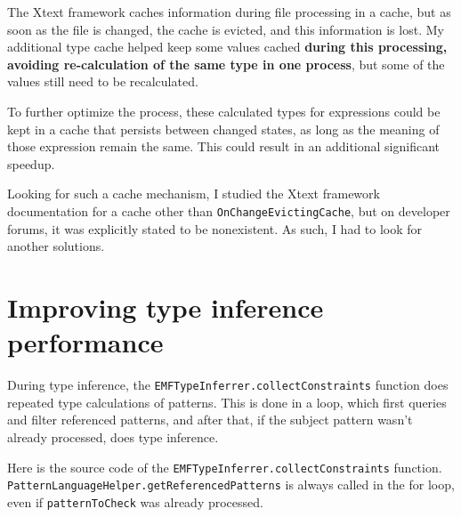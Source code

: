 \documentclass[11pt,a4paper,oneside]{report}
\begin{document}
The Xtext framework caches information during file processing in a cache, but as
soon as the file is changed, the cache is evicted, and this information is lost.
My additional type cache helped keep some values cached \textbf{during this
processing, avoiding re-calculation of the same type in one process}, but some
of the values still need to be recalculated.

To further optimize the process, these calculated types for expressions could
be kept in a cache that persists between changed states, as long as the meaning
of those expression remain the same. This could result in an additional
significant speedup.

Looking for such a cache mechanism, I studied the Xtext framework documentation
for a cache other than \texttt{OnChangeEvictingCache}, but on developer forums,
it was explicitly stated to be nonexistent\cite{xtext-fine-grained-caching}. As
such, I had to look for another solutions.

\pagebreak
\section{Improving type inference performance}
During type inference, the \texttt{EMFTypeInferrer.collectConstraints} function
does repeated type calculations of patterns. This is done in a loop, which
first queries and filter referenced patterns, and after that, if the subject
pattern wasn't already processed, does type inference.

Here is the source code of the \texttt{EMFTypeInferrer.collectConstraints}
function. \texttt{PatternLanguageHelper.getReferencedPatterns} is always called
in the for loop, even if \texttt{patternToCheck} was already processed.
\end{document}
